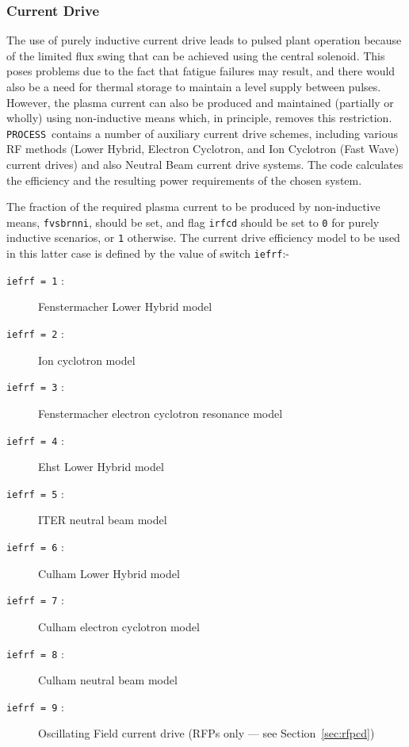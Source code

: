 \documentclass[11pt,a4paper]{report}
\newcommand{\process}{\mbox{\texttt{PROCESS}}}
\begin{document}
\subsubsection{Current Drive}

The use of purely inductive current drive leads to pulsed plant operation
because of the limited flux swing that can be achieved using the central
solenoid. This poses problems due to the fact that fatigue failures may
result, and there would also be a need for thermal storage to maintain a level
supply between pulses. However, the plasma current can also be produced and
maintained (partially or wholly) using non-inductive means which, in
principle, removes this restriction. \process\ contains a number of auxiliary
current drive schemes, including various RF methods (Lower Hybrid, Electron
Cyclotron, and Ion Cyclotron (Fast Wave) current drives) and also Neutral Beam
current drive systems. The code calculates the efficiency and the resulting
power requirements of the chosen system.

The fraction of the required plasma current to be produced by non-inductive
means, \texttt{fvsbrnni}, should be set, and flag \texttt{irfcd} should be set
to \texttt{0} for purely inductive scenarios, or \texttt{1} otherwise. The
current drive efficiency model to be used in this latter case is defined by
the value of switch \texttt{iefrf}:-

\begin{description}
\item [\texttt{iefrf = 1} :] Fenstermacher Lower Hybrid model
\item [\texttt{iefrf = 2} :] Ion cyclotron model~\cite{IPDG}
\item [\texttt{iefrf = 3} :] Fenstermacher electron cyclotron resonance model
\item [\texttt{iefrf = 4} :] Ehst Lower Hybrid model
\item [\texttt{iefrf = 5} :] ITER neutral beam model~\cite{IPDG,172}
\item [\texttt{iefrf = 6} :] Culham Lower Hybrid model~\cite{172}
\item [\texttt{iefrf = 7} :] Culham electron cyclotron model~\cite{172}
\item [\texttt{iefrf = 8} :] Culham neutral beam model~\cite{172}
\item [\texttt{iefrf = 9} :] Oscillating Field current drive (RFPs only --- see
Section~\ref{sec:rfpcd})
\end{description}
\end{document}
